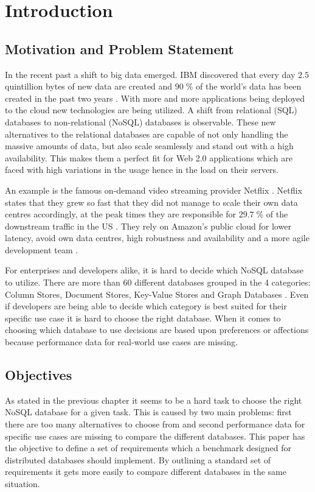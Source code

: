 
\chapter{Introduction}
\label{cha:introduction}

\section{Motivation and Problem Statement}
\label{sec:motivation-and-problem-statement}
In the recent past a shift to big data emerged. IBM discovered that every day $2.5$ quintillion bytes of new data are created and $90\;\%$ of the world's data has been created in the past two years \cite{ibm.2014}. With more and more applications being deployed to the cloud new technologies are being utilized. A shift from relational (SQL) databases to non-relational (NoSQL) databases is observable. These new alternatives to the relational databases are capable of not only handling the massive amounts of data, but also scale seamlessly and stand out with a high availability. This makes them a perfect fit for Web 2.0 applications which are faced with high variations in the usage hence in the load on their servers.

An example is the famous on-demand video streaming provider Netflix \cite{netflix.2014}. Netflix states that they grew so fast that they did not manage to scale their own data centres accordingly, at the peak times they are responsible for $29.7\;\%$ of the downstream traffic in the US \cite[1]{adhikari.2012}. They rely on Amazon's public cloud for lower latency, avoid own data centres, high robustness and availability and a more agile development team \cite[24]{netflix.2011}.

For enterprises and developers alike, it is hard to decide which NoSQL database to utilize. There are more than 60 different databases grouped in the 4 categories: Column Stores, Document Stores, Key-Value Stores and Graph Databases \cite[1 - 2]{tudorica.2011}. Even if developers are being able to decide which category is best suited for their specific use case it is hard to choose the right database. When it comes to choosing which database to use decisions are based upon preferences or affections because performance data for real-world use cases are missing.

\section{Objectives}
\label{sec:objectives}
As stated in the previous chapter it seems to be a hard task to choose the right NoSQL database for a given task. This is caused by two main problems: first there are too many alternatives to choose from and second performance data for specific use cases are missing to compare the different databases.
This paper has the objective to define a set of requirements which a benchmark designed for distributed databases should implement. By outlining a standard set of requirements it gets more easily to compare different databases in the same situation.

